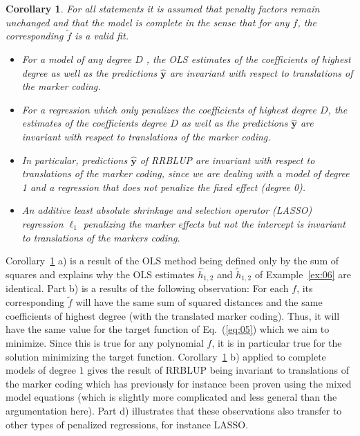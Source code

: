 \documentclass{bmcart}
\newtheorem{corollary}{Corollary}
\newcommand{\0}{\mathbf{0}}
\newcommand{\y}{\mathbf{y}}
\begin{document}
\begin{corollary}\label{cor:01}
	For all statements it is assumed that penalty factors remain unchanged and that the model is complete in the sense that for any $f$, the corresponding $\tilde{f}$ is a valid fit.
	\begin{itemize}
\item [a)] 	For a model of any degree $D$ , the OLS estimates of the coefficients of highest degree as well as the predictions $\hat{\y}$ are invariant with respect to translations of the marker coding.
		\item [b)] For a regression which only penalizes the coefficients of highest degree $D$, the estimates of the coefficients degree $D$ as well as the predictions $\hat{\y}$ are invariant with respect to translations of the marker coding.
		\item[c)] 	In particular, predictions $\hat{\y}$ of RRBLUP are invariant with respect to translations of the marker coding, since we are dealing with a model of degree 1 and a regression that does not penalize the fixed effect (degree 0).
		\item[d)] An additive least absolute shrinkage and selection operator (LASSO) regression $\ell_1$ penalizing the marker effects but not the intercept is invariant to translations of the markers coding. 

	\end{itemize}
\end{corollary}
Corollary~\ref{cor:01} a) is a result of the OLS method being defined only by the sum of squares and explains why the OLS estimates $\hat{h}_{1,2}$ and $\tilde{h}_{1,2}$ of Example~\ref{ex:06} are identical. Part b) is a results of the following observation: For each $f$, its corresponding $\tilde{f}$ will have the same sum of squared distances and the same coefficients of highest degree (with the translated marker coding). Thus, it will have the same value for the target function of Eq.~(\ref{eq:05}) which we aim to minimize.
Since this is true for any polynomial $f$, it is in particular true for the solution minimizing the target function.
Corollary~\ref{cor:01} b) applied to complete models of degree $1$ gives the result of RRBLUP being invariant to translations of the marker coding which has previously for instance been proven using the mixed model equations (which is slightly more complicated and less general than the argumentation here). Part d) illustrates that these observations also transfer to other types of penalized regressions, for instance LASSO. 
\end{document}
